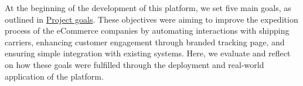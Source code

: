 



At the beginning of the development of this platform, we set five main goals, as outlined in \hyperref[subsec:project-goals]{Project goals}. 
These objectives were aiming to improve the expedition process of the eCommerce companies by automating interactions with shipping carriers, enhancing customer engagement through branded tracking page, and ensuring simple integration with existing systems. 
Here, we evaluate and reflect on how these goals were fulfilled through the deployment and real-world application of the platform.

